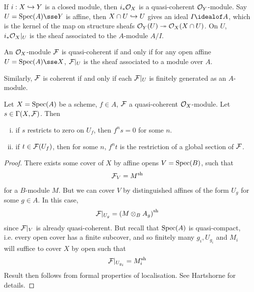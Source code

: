 \documentclass{article}
\begin{document}
\begin{example}
    If \(i : X \hookrightarrow Y\) is a closed module, then \(i_*\mathcal{O}_X\) is a quasi-coherent \(\mathcal{O}_Y\)-module. Say \(U = \Spec(A) \sse Y\) is affine, then \(X \cap U \hookrightarrow U\) gives an ideal \(I \idealof A\), which is the kernel of the map on structure sheafs \(\mathcal{O}_Y(U) \twoheadrightarrow \mathcal{O}_X(X \cap U)\). On \(U\), \(i_*\mathcal{O}_X\vert_U\) is the sheaf associated to the \(A\)-module \(A/I\).
\end{example}

\begin{proposition}
    \label{prop:quasi-coherent-iff}
    An \(\mathcal{O}_X\)-module \(\mathcal{F}\) is quasi-coherent if and only if for any open affine \(U = \Spec(A) \sse X\), \(\mathcal{F}\vert_U\) is the sheaf associated to a module over \(A\).

    Similarly, \(\mathcal{F}\) is coherent if and only if each \(\mathcal{F}\vert_U\) is finitely generated as an \(A\)-module.
\end{proposition}

\begin{lemma}
    \label{lem:restriction-of-global-section-if-mult}
    Let \(X = \operatorname{Spec}(A)\) be a scheme, \(f \in A\), \(\mathcal{F}\) a quasi-coherent \(\mathcal{O}_X\)-module. Let \(s \in \Gamma(X, \mathcal{F})\). Then
    \begin{enumerate}[(i)]
        \item if \(s\) restricts to zero on \(U_f\), then \(f^ns = 0\) for some \(n\).
        \item if \(t \in \mathcal{F}(U_f)\), then for some \(n\), \(f^n t\) is the restriction of a global section of \(\mathcal{F}\).
    \end{enumerate}
\end{lemma}

\begin{proof}
    There exists some cover of \(X\) by affine opens \(V = \operatorname{Spec}(B)\), such that
    \[\mathcal{F}_V = M^{\operatorname{sh}}\]
    for a \(B\)-module \(M\). But we can cover \(V\) by distinguished affines of the form \(U_g\) for some \(g \in A\). In this case,
    \[\mathcal{F}\vert_{U_g} = \left(M \otimes_B A_g\right)^{\operatorname{sh}}\]
    since \(\mathcal{F}\vert_V\) is already quasi-coherent. But recall that \(\operatorname{Spec}(A)\) is quasi-compact, i.e. every open cover has a finite subcover, and so finitely many \(g_i, U_{g_i}\) and \(M_i\) will suffice to cover \(X\) by open such that
    \[\mathcal{F}\vert_{U_{g_i}} = M_i^{\operatorname{sh}}\]
    Result then follows from formal properties of localisation. See Hartshorne for details.
\end{proof}
\end{document}

